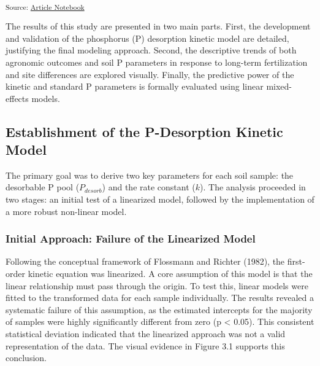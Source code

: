\documentclass[
  a4paper,
]{article}
\begin{document}
\textsubscript{Source:
\href{https://Andrapodon.github.io/Master-Thesis-P-kinetics/index.qmd.html}{Article
Notebook}}

The results of this study are presented in two main parts. First, the
development and validation of the phosphorus (P) desorption kinetic
model are detailed, justifying the final modeling approach. Second, the
descriptive trends of both agronomic outcomes and soil P parameters in
response to long-term fertilization and site differences are explored
visually. Finally, the predictive power of the kinetic and standard P
parameters is formally evaluated using linear mixed-effects models.

\subsection{Establishment of the P-Desorption Kinetic
Model}\label{establishment-of-the-p-desorption-kinetic-model}

The primary goal was to derive two key parameters for each soil sample:
the desorbable P pool (\(P_{desorb}\)) and the rate constant (\(k\)).
The analysis proceeded in two stages: an initial test of a linearized
model, followed by the implementation of a more robust non-linear model.

\subsubsection{Initial Approach: Failure of the Linearized
Model}\label{initial-approach-failure-of-the-linearized-model}

Following the conceptual framework of Flossmann and Richter (1982), the
first-order kinetic equation was linearized. A core assumption of this
model is that the linear relationship must pass through the origin. To
test this, linear models were fitted to the transformed data for each
sample individually. The results revealed a systematic failure of this
assumption, as the estimated intercepts for the majority of samples were
highly significantly different from zero (p \textless{} 0.05). This
consistent statistical deviation indicated that the linearized approach
was not a valid representation of the data. The visual evidence in
Figure 3.1 supports this conclusion.
\end{document}
